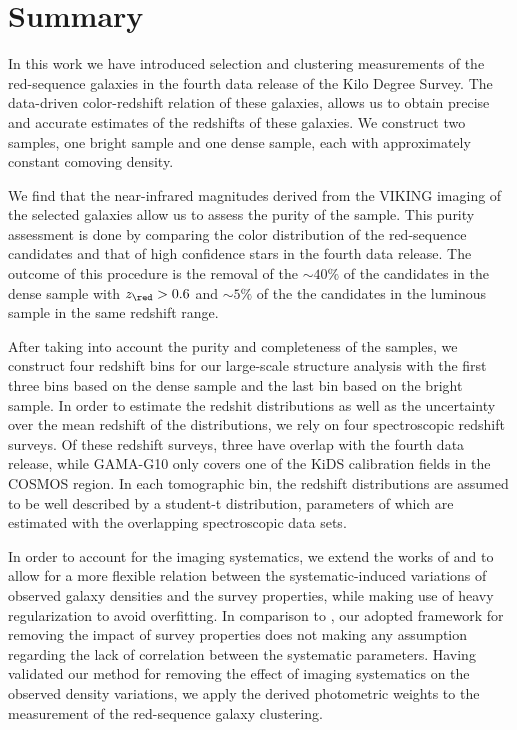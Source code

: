 \documentclass[fleqn,usenatbib,useAMS]{mnras}
\begin{document}

\section{Summary}\label{sec:summary} 

In this work we have introduced selection and clustering measurements of the red-sequence galaxies in the fourth data release of the Kilo Degree Survey. The data-driven color-redshift relation of these galaxies, allows us to obtain precise and accurate estimates of the redshifts of these galaxies. We construct two samples, one bright sample and one dense sample, each with approximately constant comoving density.

We find that the near-infrared magnitudes derived from the VIKING imaging of the selected galaxies allow us to assess the purity of the sample. This purity assessment is done by comparing the color distribution of the red-sequence candidates and that of high confidence stars in the fourth data release. The outcome of this procedure is the removal of the $\sim40\%$ of the candidates in the dense sample with $z_{\red}>0.6$ and $\sim5\%$ of the the candidates in the luminous sample in the same redshift range.

After taking into account the purity and completeness of the samples, we construct four redshift bins for our large-scale structure analysis with the first three bins based on the dense sample and the last bin based on the bright sample. 
In order to estimate the redshit distributions as well as the uncertainty over the mean redshift of the distributions, we rely on four spectroscopic redshift surveys. Of these redshift surveys, three have overlap with the fourth data release, while GAMA-G10 only covers one of the KiDS calibration fields in the COSMOS region. In each tomographic bin, the redshift distributions are assumed to be well described by a student-t distribution, parameters of which are estimated with the overlapping spectroscopic data sets. 

In order to account for the imaging systematics, we extend the works of \citet{bautista2018sdss} and \citet{icaza2020clustering} to allow for a more flexible relation between the systematic-induced variations of observed galaxy densities and the survey properties, while making use of heavy regularization to avoid overfitting. In comparison to \citet{ross2012clustering, crocce2019dark}, our adopted framework for removing the impact of survey properties does not making any assumption regarding the lack of correlation between the systematic parameters. Having validated our method for removing the effect of imaging systematics on the observed density variations, we apply the derived photometric weights to the measurement of the red-sequence galaxy clustering.
\end{document}
